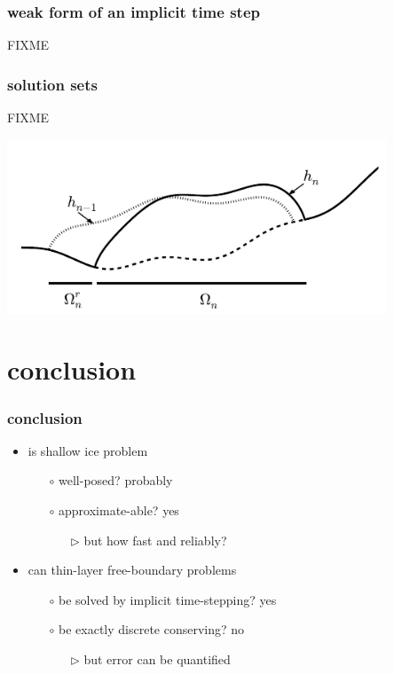\documentclass[hide notes,intlimits]{beamer}
\begin{document}
\begin{frame}
  \frametitle{weak form of an implicit time step}
FIXME
\end{frame}


\begin{frame}
  \frametitle{solution sets}
FIXME

\begin{center}
\includegraphics[width=0.85\textwidth,keepaspectratio=true]{cartoon-sets}
\end{center}
\end{frame}


\section*{conclusion}

\begin{frame}
  \frametitle{conclusion}

\begin{itemize}
\item is shallow ice problem
  \begin{itemize}
  \item[$\circ$] well-posed? \qquad \alert{probably}
  \item[$\circ$] approximate-able? \qquad \alert{yes}
     \begin{itemize}
     \item[$\triangleright$] but how fast and reliably?
     \end{itemize}
  \end{itemize}
\item can thin-layer free-boundary problems
  \begin{itemize}
  \item[$\circ$] be solved by implicit time-stepping? \qquad \alert{yes}
  \item[$\circ$] be exactly discrete conserving? \qquad \alert{no}
     \begin{itemize}
     \item[$\triangleright$] but error can be quantified
     \end{itemize}
  \end{itemize}
\end{itemize}
\end{frame}
\end{document}
